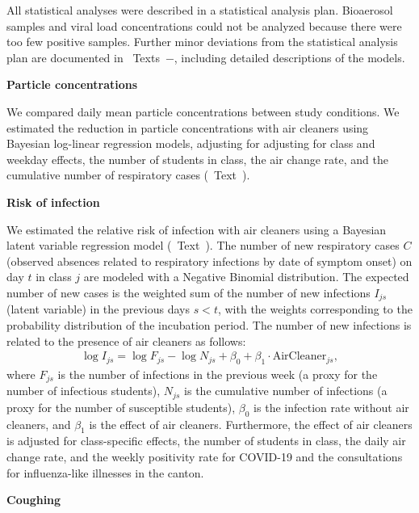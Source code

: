 \documentclass[fleqn,11pt]{wlscirep}
\begin{document}
All statistical analyses were described in a statistical analysis plan\cite{Banholzer2023SAP}. Bioaerosol samples and viral load concentrations could not be analyzed because there were too few positive samples. Further minor deviations from the statistical analysis plan are documented in \supp~Texts~$-$, including detailed descriptions of the models. \medskip

\noindent\textbf{Particle concentrations} \smallskip

\noindent We compared daily mean particle concentrations between study conditions. We estimated the reduction in particle concentrations with air cleaners using Bayesian log-linear regression models, adjusting for adjusting for class and weekday effects, the number of students in class, the air change rate, and the cumulative number of respiratory cases (\supp~Text~).\medskip %

\noindent\textbf{Risk of infection} \smallskip

\noindent We estimated the relative risk of infection with air cleaners using a Bayesian latent variable regression model (\supp~Text~). The number of new respiratory cases $C$ (observed absences related to respiratory infections by date of symptom onset) on day $t$ in class $j$ are modeled with a Negative Binomial distribution. The expected number of new cases is the weighted sum of the number of new infections $I_{js}$ (latent variable) in the previous days $s<t$, with the weights corresponding to the probability distribution of the incubation period. The number of new infections is related to the presence of air cleaners as follows:
\begin{align}
    \log I_{js} = \log F_{js} - \log N_{js} + \beta_0 + \beta_1 \cdot \text{AirCleaner}_{js},
\end{align}
where $F_{js}$ is the number of infections in the previous week (a proxy for the number of infectious students), $N_{js}$ is the cumulative number of infections (a proxy for the number of susceptible students), $\beta_0$ is the infection rate without air cleaners, and $\beta_1$ is the effect of air cleaners. Furthermore, the effect of air cleaners is adjusted for class-specific effects, the number of students in class, the daily air change rate, and the weekly positivity rate for COVID-19 and the consultations for influenza-like illnesses in the canton. \medskip

\noindent\textbf{Coughing} \smallskip
\end{document}
